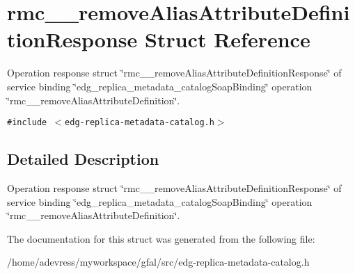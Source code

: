 \section{rmc\_\-\_\-remove\-Alias\-Attribute\-Definition\-Response Struct Reference}
\label{structrmc____removeAliasAttributeDefinitionResponse}
Operation response struct \char`\"{}rmc\_\-\_\-remove\-Alias\-Attribute\-Definition\-Response\char`\"{} of service binding \char`\"{}edg\_\-replica\_\-metadata\_\-catalog\-Soap\-Binding\char`\"{} operation \char`\"{}rmc\_\-\_\-remove\-Alias\-Attribute\-Definition\char`\"{}.  


{\tt \#include $<$edg-replica-metadata-catalog.h$>$}



\subsection{Detailed Description}
Operation response struct \char`\"{}rmc\_\-\_\-remove\-Alias\-Attribute\-Definition\-Response\char`\"{} of service binding \char`\"{}edg\_\-replica\_\-metadata\_\-catalog\-Soap\-Binding\char`\"{} operation \char`\"{}rmc\_\-\_\-remove\-Alias\-Attribute\-Definition\char`\"{}. 



The documentation for this struct was generated from the following file:\begin{CompactItemize}
\item 
/home/adevress/myworkspace/gfal/src/edg-replica-metadata-catalog.h\end{CompactItemize}
